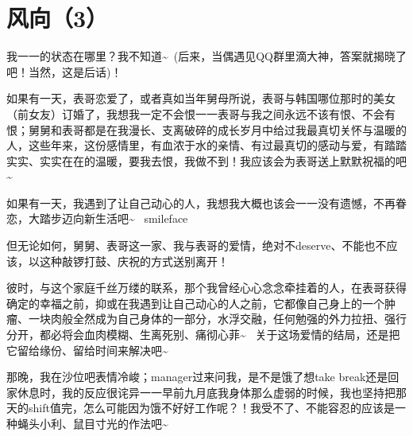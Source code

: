 \documentclass[12pt]{book}
\begin{document}
\section{风向（3）}
\label{sec-50-3}

我一一的状态在哪里？我不知道\textasciitilde{}~(后来，当偶遇见QQ群里滴大神，答案就揭晓了吧！当然，这是后话)！

如果有一天，表哥恋爱了，或者真如当年舅母所说，表哥与韩国哪位那时的美女（前女友）订婚了，我想我一定不会恨一一表哥与我之间永远不该有恨、不会有恨；舅舅和表哥都是在我漫长、支离破碎的成长岁月中给过我最真切关怀与温暖的人，这些年来，这份感情里，有血浓于水的亲情、有过最真切的感动与爱，有踏踏实实、实实在在的温暖，要我去恨，我做不到！我应该会为表哥送上默默祝福的吧\textasciitilde{}~ 

如果有一天，我遇到了让自己动心的人，我想我大概也该会一一没有遗憾，不再眷恋，大踏步迈向新生活吧\textasciitilde{}~ smileface

但无论如何，舅舅、表哥这一家、我与表哥的爱情，绝对不deserve、不能也不应该，以这种敲锣打鼓、庆祝的方式送别离开！

彼时，与这个家庭千丝万缕的联系，那个我曾经心心念念牵挂着的人，在表哥获得确定的幸福之前，抑或在我遇到让自己动心的人之前，它都像自己身上的一个肿瘤、一块肉般全然成为自己身体的一部分，水浮交融，任何勉强的外力拉扭、强行分开，都必将会血肉模糊、生离死别、痛彻心菲\textasciitilde{}~ 关于这场爱情的结局，还是把它留给缘份、留给时间来解决吧\textasciitilde{}~

那晚，我在沙位吧表情冷峻；manager过来问我，是不是饿了想take break还是回家休息时，我的反应很诧异一一早前九月底我身体那么虚弱的时候，我也坚持把那天的shift值完，怎么可能因为饿不好好工作呢？！我受不了、不能容忍的应该是一种蝇头小利、鼠目寸光的作法吧\textasciitilde{}~
\end{document}
